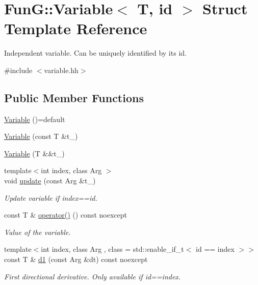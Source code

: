 \hypertarget{structFunG_1_1Variable}{\section{Fun\-G\-:\-:Variable$<$ T, id $>$ Struct Template Reference}
\label{structFunG_1_1Variable}
}


Independent variable. Can be uniquely identified by its id.  




{\ttfamily \#include $<$variable.\-hh$>$}

\subsection*{Public Member Functions}
\begin{DoxyCompactItemize}
\item 
\hyperlink{structFunG_1_1Variable_a20d207e651ee9e93c86dfa4ea1053f56}{Variable} ()=default
\item 
\hyperlink{structFunG_1_1Variable_a10238450dac2ec4c98400b106543ff8f}{Variable} (const T \&t\-\_\-)
\item 
\hyperlink{structFunG_1_1Variable_a9abfae2c2ab06cbe2556600bae7c7ccb}{Variable} (T \&\&t\-\_\-)
\item 
{\footnotesize template$<$int index, class Arg $>$ }\\void \hyperlink{structFunG_1_1Variable_a50f4d34586aa6a89df604503e0a3c2a9}{update} (const Arg \&t\-\_\-)
\begin{DoxyCompactList}\small\item\em Update variable if index==id. \end{DoxyCompactList}\item 
const T \& \hyperlink{structFunG_1_1Variable_a84333150762e0e5472ab508ca3f26e4f}{operator()} () const noexcept
\begin{DoxyCompactList}\small\item\em Value of the variable. \end{DoxyCompactList}\item 
{\footnotesize template$<$int index, class Arg , class  = std\-::enable\-\_\-if\-\_\-t$<$ id == index $>$$>$ }\\const T \& \hyperlink{structFunG_1_1Variable_a9384160b4015767ffe6a058583fef10a}{d1} (const Arg \&dt) const noexcept
\begin{DoxyCompactList}\small\item\em First directional derivative. Only available if id==index. \end{DoxyCompactList}\end{DoxyCompactItemize}



